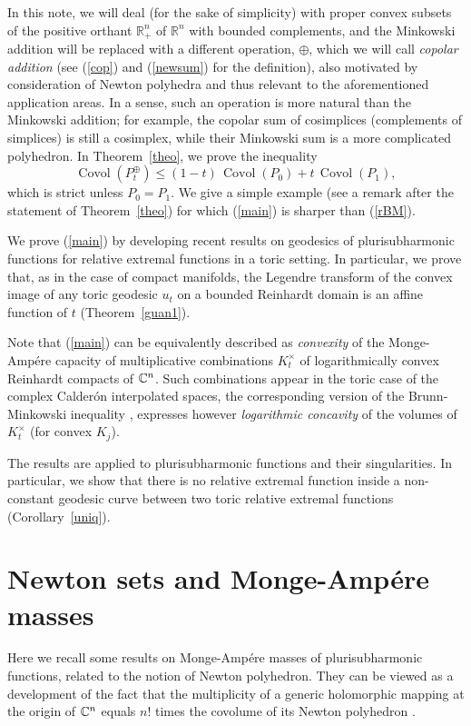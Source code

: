 \documentclass[12pt]{article}
\newcommand{\beq}{\begin{equation}}
\newcommand{\eeq}{\end{equation}}
\numberwithin{equation}{section}
\newcommand{\Covol}{{\operatorname{Covol}}}
\newcommand{\Rn}{{\mathbb R}^n}
\newcommand{\Rnp}{{\mathbb R}_+^n}
\newcommand{\Cn}{{\mathbb  C\sp n}}
\begin{document}
In this note, we will deal (for the sake of simplicity) with proper convex subsets of the positive orthant $\Rnp$ of $\Rn$ with bounded complements, and the Minkowski addition will be replaced with a different operation, $\oplus$, which we will call {\it copolar addition} (see  (\ref{cop}) and (\ref{newsum}) for the definition), also motivated by consideration of Newton polyhedra and thus relevant to the aforementioned application areas. In a sense, such an operation is more natural than the Minkowski addition; for example, the copolar sum of cosimplices (complements of simplices) is still a cosimplex, while their Minkowski sum is a more complicated polyhedron. In Theorem~\ref{theo}, we prove the inequality
\beq\label{main}\Covol(P_t^\oplus)\le (1-t)\,\Covol(P_0)+ t\,\Covol(P_1),\eeq
which is strict unless $P_0=P_1$. We give a simple example (see a remark after the statement of Theorem~\ref{theo}) for which (\ref{main}) is sharper than (\ref{rBM}).

We prove (\ref{main}) by developing recent results on geodesics of plurisubharmonic functions \cite{R16} for relative extremal functions in a toric setting. In particular, we prove that, as in the case of compact manifolds, the Legendre transform of the convex image of any toric geodesic $u_t$ on a bounded Reinhardt domain is an affine function of $t$ (Theorem~\ref{guan1}).

Note that (\ref{main}) can be equivalently described as {\sl convexity} of the Monge-Amp\'ere capacity of multiplicative combinations $K_t^\times$ of logarithmically convex Reinhardt compacts of $\Cn$. Such combinations appear in the toric case of the complex Calder\'{o}n interpolated spaces, the corresponding version of the Brunn-Minkowski inequality \cite{CE}, \cite{CEK} expresses however {\sl logarithmic concavity} of the volumes of $K_t^\times$ (for convex $K_j$).

 The results are applied to plurisubharmonic functions and their singularities. In particular, we show that there is no relative extremal function inside a non-constant geodesic curve between two toric relative extremal functions (Corollary~\ref{uniq}).


\section{Newton sets and Monge-Amp\'ere masses}
\label{Motiv}
Here we recall some results on Monge-Amp\'ere masses of plurisubharmonic functions, related to the notion of Newton polyhedron. They can be viewed as a development of the fact that the multiplicity of a generic holomorphic mapping at the origin of $\Cn$ equals $n!$ times the covolume of its Newton polyhedron \cite{Ku1}.
\end{document}
